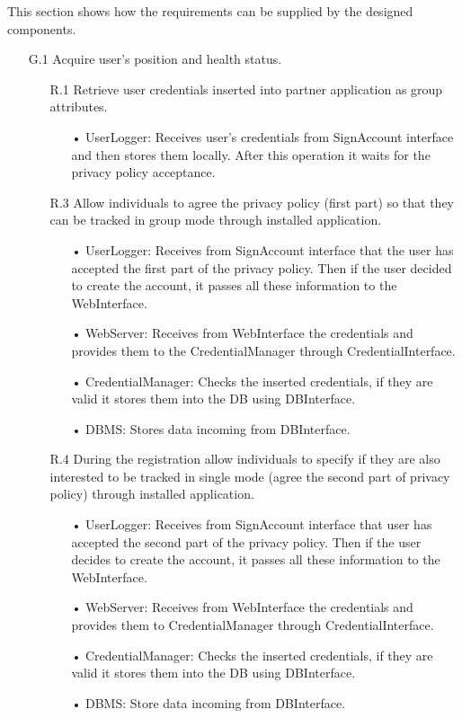 \noindent
This section shows how the requirements can be supplied by the designed components.

\begin{enumerate}

\item [G.1] Acquire user’s position and health status.
	\begin{enumerate}
	\item [ R.1] Retrieve user credentials inserted into partner application as group attributes.
		\begin{enumerate}
		\item[•] UserLogger: Receives user's credentials from SignAccount interface and then stores them locally. After this operation it waits for the privacy policy acceptance.
		\end{enumerate}

	\item [ R.3] Allow individuals to agree the privacy policy (first part) so that they can be tracked in group mode through installed application.  
		\begin{enumerate}
		\item[•] UserLogger: Receives from SignAccount interface that the user has accepted the first part of the privacy policy. Then if the user decided to create the account, it passes all these information to the WebInterface.
		\item[•] WebServer: Receives from WebInterface the credentials and provides them to the CredentialManager through CredentialInterface.
		\item[•] CredentialManager: Checks the inserted credentials, if they are valid it stores them into the DB using DBInterface.
		\item[•] DBMS: Stores data incoming from DBInterface.
		\end{enumerate}
	
	\item [R.4] During the registration allow individuals to specify if they are also interested to be tracked in single mode (agree the second part of privacy policy) through installed application.
		\begin{enumerate}
		\item[•] UserLogger: Receives from SignAccount interface that user has accepted the second part of the privacy policy. Then if the user decides to create the account, it passes all these information to the WebInterface.
		\item[•] WebServer: Receives from WebInterface the credentials and provides them to CredentialManager through CredentialInterface.
		\item[•] CredentialManager: Checks the inserted credentials, if they are valid it stores them into the DB using DBInterface.
		\item[•] DBMS: Store data incoming from DBInterface.
		\end{enumerate}


\end{enumerate}
\end{enumerate}
